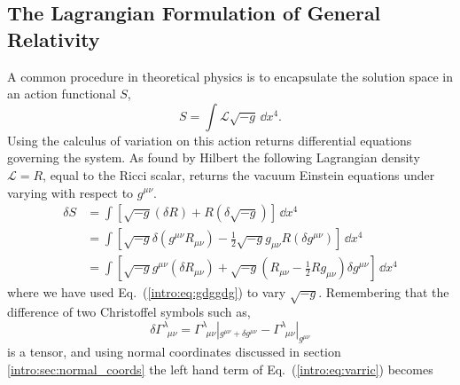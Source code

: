 


\subsection{The Lagrangian Formulation of General Relativity}\label{intro:sec:gr_from_lagrangean}
A common procedure in theoretical physics is to encapsulate the solution space in an action functional $S$,
\begin{equation}
S = \int \mathcal{L} \sqrt{-g} \,\dd x^4.
\end{equation}
Using the calculus of variation on this action returns differential equations governing the system. As found by Hilbert \cite{hilbert1915grundlagen} the following Lagrangian density $\mathcal{L}=R$, equal to the Ricci scalar, returns the vacuum Einstein equations under varying with respect to $g^{\mu\nu}$.
\begin{align}
\delta S &= \int \left[\sqrt{-g} (\delta R) + R (\delta \sqrt{-g})\right]\,\dd x^4 \\
&= \int \left[\sqrt{-g} \delta(g^{\mu\nu}R_{\mu\nu}) -\frac{1}{2} \sqrt{-g} g_{\mu\nu}R (\delta g^{\mu\nu})\right]\,\dd x^4 \\
&= \int \left[\sqrt{-g}g^{\mu\nu}(\delta R_{\mu\nu}) + \sqrt{-g}\left(R_{\mu\nu}-\frac{1}{2}R g_{\mu\nu} \right)\delta g^{\mu\nu}\right]\,\dd x^4 \label{intro:eq:varric}
\end{align}  
where we have used Eq.~(\ref{intro:eq:gdggdg}) to vary $\sqrt{-g}$. Remembering that the difference of two Christoffel symbols such as,
\begin{equation}
\delta \Gamma^{\lambda}_{\,\,\,\mu\nu} = \Gamma^{\lambda}_{\,\,\,\mu\nu}|_{g^{\mu\nu}+\delta g^{\mu\nu}} - \Gamma^{\lambda}_{\,\,\,\mu\nu}|_{g^{\mu\nu}}
\end{equation} 
is a tensor, and using normal coordinates discussed in section \ref{intro:sec:normal_coords} the left hand term of Eq.~(\ref{intro:eq:varric}) becomes

